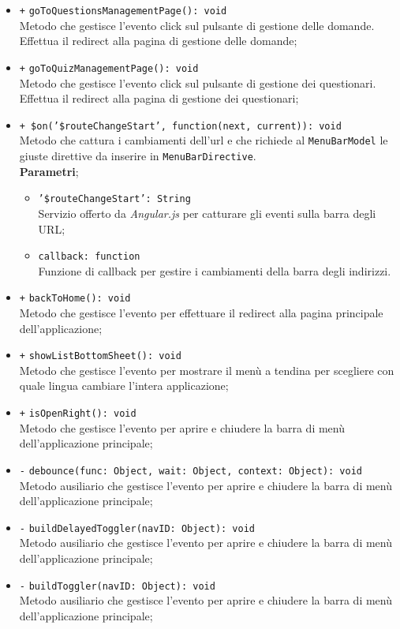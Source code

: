 \begin{itemize}
\begin{itemize}
		\item \texttt{+} \texttt{goToQuestionsManagementPage(): void} \\
		Metodo che gestisce l'evento click sul pulsante di gestione delle domande. Effettua il redirect alla pagina di gestione delle domande; 
		\item \texttt{+} \texttt{goToQuizManagementPage(): void} \\
		Metodo che gestisce l'evento click sul pulsante di gestione dei questionari. Effettua il redirect alla pagina di gestione dei questionari;
		\item \texttt{+ \$on('\$routeChangeStart', function(next, current)): void} \\
		Metodo che cattura i cambiamenti dell'url e che richiede al \texttt{MenuBarModel} le giuste direttive da inserire in \texttt{MenuBarDirective}.\\
		\textbf{Parametri};
		\begin{itemize}
			\item \texttt{'\$routeChangeStart': String}	\\ Servizio offerto da \textit{Angular.js} per catturare gli eventi sulla barra degli URL;
			\item \texttt{callback: function}	\\ Funzione di callback per gestire i cambiamenti della barra degli indirizzi.
		\end{itemize}
		\item \texttt{+} \texttt{backToHome(): void} \\
		Metodo che gestisce l'evento per effettuare il redirect alla pagina principale dell'applicazione; 
		\item \texttt{+} \texttt{showListBottomSheet(): void} \\
		Metodo che gestisce l'evento per mostrare il menù a tendina per scegliere con quale lingua cambiare l'intera applicazione; 
		\item \texttt{+} \texttt{isOpenRight(): void} \\
		Metodo che gestisce l'evento per aprire e chiudere la barra di menù dell'applicazione principale; 
		\item \texttt{-} \texttt{debounce(func: Object, wait: Object, context: Object): void} \\
		Metodo ausiliario che gestisce l'evento per aprire e chiudere la barra di menù dell'applicazione principale; 
		\item \texttt{-} \texttt{buildDelayedToggler(navID: Object): void} \\
		Metodo ausiliario che gestisce l'evento per aprire e chiudere la barra di menù dell'applicazione principale; 
		\item \texttt{-} \texttt{buildToggler(navID: Object): void} \\
		Metodo ausiliario che gestisce l'evento per aprire e chiudere la barra di menù dell'applicazione principale;
	\end{itemize}
	
\end{itemize}